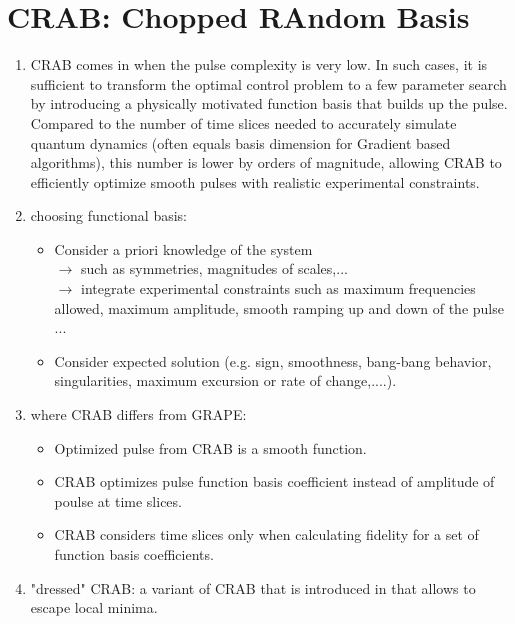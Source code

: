 \documentclass[12pt]{report}
\begin{document}
\section{CRAB: Chopped RAndom Basis}


\begin{enumerate}
    \item CRAB comes in when the pulse complexity is very low. \cite{PhysRevLett.106.190501}\cite{PhysRevA.84.022326} In such cases, it is sufficient to transform the optimal control problem to a few parameter search by introducing a physically motivated function basis that builds up the pulse. 
        Compared to the number of time slices needed to accurately simulate quantum dynamics (often equals basis dimension for Gradient based algorithms), this number is lower by orders of magnitude, 
        allowing CRAB to efficiently optimize smooth pulses with realistic experimental constraints. 
    \item choosing functional basis: 
        \begin{itemize}
            \item Consider a priori knowledge of the system \\
                $\rightarrow$ such as symmetries, magnitudes of scales,... \\
                $\rightarrow$ integrate experimental constraints such as maximum frequencies allowed, maximum amplitude, smooth ramping up and down of the pulse ...
            \item Consider expected solution (e.g. sign, smoothness, bang-bang behavior, singularities, maximum excursion or rate of change,....).
        \end{itemize}
    \item where CRAB differs from GRAPE: 
        \begin{itemize}
            \item Optimized pulse from CRAB is a smooth function.
            \item CRAB optimizes pulse function basis coefficient instead of amplitude of poulse at time slices.
            \item CRAB considers time slices only when calculating fidelity for a set of function basis coefficients. 
        \end{itemize}
    \item "dressed" CRAB: a variant of CRAB that is introduced in \cite{PhysRevA.92.062343} that allows to escape local minima. 
\end{enumerate}
\end{document}
